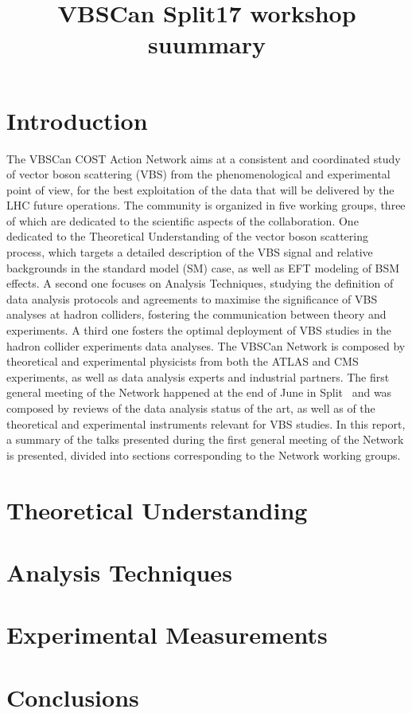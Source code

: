 \documentclass{article}
\title{VBSCan Split17 workshop suummary}
\begin{document}
\maketitle 


\section*{Introduction}

The VBSCan COST Action Network aims at a consistent and coordinated study of vector boson scattering (VBS)
from the phenomenological and experimental point of view, 
for the best exploitation of the data that will be delivered by the LHC future operations.
The community is organized in five working groups,
three of which are dedicated to the scientific aspects of the collaboration.
One dedicated to the Theoretical Understanding of the vector boson scattering process,
which targets a detailed description of the VBS signal 
and relative backgrounds in the standard model (SM) case, 
as well as EFT modeling of BSM effects.
A second one focuses on Analysis Techniques,
studying the definition of data analysis protocols and agreements 
to maximise the significance of VBS analyses at hadron colliders, 
fostering the communication between theory and experiments.
A third one fosters the optimal deployment of VBS studies 
in the hadron collider experiments data analyses.
\newline{}
The VBSCan Network is composed by theoretical and experimental physicists from both the ATLAS and CMS experiments,
as well as data analysis experts and industrial partners.
The first general meeting of the Network happened at the end of June in Split~\cite{Ablikim:2017duf}
and was composed by reviews of the data analysis status of the art,
as well as of the theoretical and experimental instruments
relevant for VBS studies.
In this report,
a summary of the talks presented during the first general meeting of the Network is presented,
divided into sections corresponding to the Network working groups.

\section{Theoretical Understanding}
\section{Analysis Techniques}
\section{Experimental Measurements}

\section*{Conclusions}

\printbibliography
\end{document}

